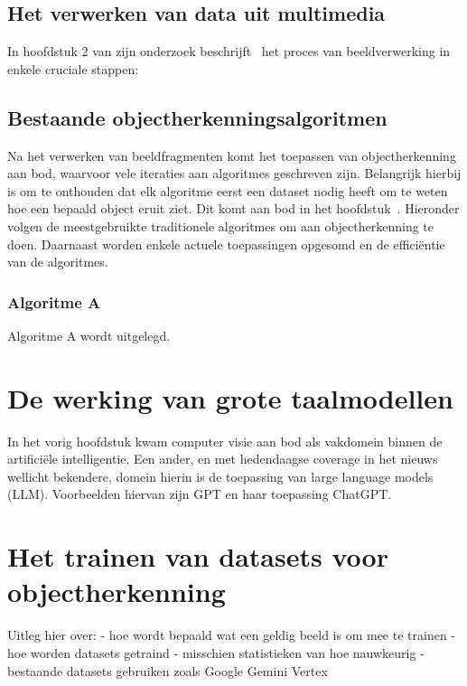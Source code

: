 \subsection{Het verwerken van data uit multimedia}\label{subsec:het-verwerken-van-data}
In hoofdstuk 2 van zijn onderzoek beschrijft~\textcite{Olaoye2024} het proces van beeldverwerking in enkele cruciale stappen:

\subsection{Bestaande objectherkenningsalgoritmen}\label{subsec:bestaande-algoritmen}
Na het verwerken van beeldfragmenten komt het toepassen van objectherkenning aan bod, waarvoor vele iteraties aan algoritmes geschreven zijn.
Belangrijk hierbij is om te onthouden dat elk algoritme eerst een dataset nodig heeft om te weten hoe een bepaald object eruit ziet.
Dit komt aan bod in het hoofdstuk~.
Hieronder volgen de meestgebruikte traditionele algoritmes om aan objectherkenning te doen.
Daarnaast worden enkele actuele toepassingen opgesomd en de effici\"entie van de algoritmes.

\subsubsection{Algoritme A}
Algoritme A wordt uitgelegd.



\section{De werking van grote taalmodellen}
\label{sec:ls-artificiele-intelligentie}
In het vorig hoofdstuk kwam computer visie aan bod als vakdomein binnen de artifici\"ele intelligentie.
Een ander, en met hedendaagse coverage in het nieuws wellicht bekendere, domein hierin is de toepassing van large language models (LLM).
Voorbeelden hiervan zijn GPT en haar toepassing ChatGPT. %

\section{Het trainen van datasets voor objectherkenning}\label{sec:datasets}
Uitleg hier over: %
- hoe wordt bepaald wat een geldig beeld is om mee te trainen
- hoe worden datasets getraind
- misschien statistieken van hoe nauwkeurig
- bestaande datasets gebruiken zoals Google Gemini Vertex
